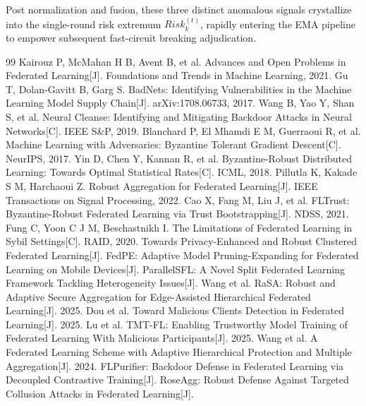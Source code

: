\documentclass[runningheads,orivec]{llncs}
\begin{document}
Post normalization and fusion, these three distinct anomalous signals crystallize into the single-round risk extremum $Risk_{k}^{(t)}$, rapidly entering the EMA pipeline to empower subsequent fast-circuit breaking adjudication.

\begin{thebibliography}{99}
     Kairouz P, McMahan H B, Avent B, et al. Advances and Open Problems in Federated Learning[J]. Foundations and Trends in Machine Learning, 2021.
     Gu T, Dolan-Gavitt B, Garg S. BadNets: Identifying Vulnerabilities in the Machine Learning Model Supply Chain[J]. arXiv:1708.06733, 2017.
     Wang B, Yao Y, Shan S, et al. Neural Cleanse: Identifying and Mitigating Backdoor Attacks in Neural Networks[C]. IEEE S\&P, 2019.
     Blanchard P, El Mhamdi E M, Guerraoui R, et al. Machine Learning with Adversaries: Byzantine Tolerant Gradient Descent[C]. NeurIPS, 2017.
     Yin D, Chen Y, Kannan R, et al. Byzantine-Robust Distributed Learning: Towards Optimal Statistical Rates[C]. ICML, 2018.
     Pillutla K, Kakade S M, Harchaoui Z. Robust Aggregation for Federated Learning[J]. IEEE Transactions on Signal Processing, 2022.
     Cao X, Fang M, Liu J, et al. FLTrust: Byzantine-Robust Federated Learning via Trust Bootstrapping[J]. NDSS, 2021.
     Fung C, Yoon C J M, Beschastnikh I. The Limitations of Federated Learning in Sybil Settings[C]. RAID, 2020.
     Towards Privacy-Enhanced and Robust Clustered Federated Learning[J].
     FedPE: Adaptive Model Pruning-Expanding for Federated Learning on Mobile Devices[J].
     ParallelSFL: A Novel Split Federated Learning Framework Tackling Heterogeneity Issues[J].
     Wang et al. RaSA: Robust and Adaptive Secure Aggregation for Edge-Assisted Hierarchical Federated Learning[J]. 2025.
     Dou et al. Toward Malicious Clients Detection in Federated Learning[J]. 2025.
     Lu et al. TMT-FL: Enabling Trustworthy Model Training of Federated Learning With Malicious Participants[J]. 2025.
     Wang et al. A Federated Learning Scheme with Adaptive Hierarchical Protection and Multiple Aggregation[J]. 2024.
     FLPurifier: Backdoor Defense in Federated Learning via Decoupled Contrastive Training[J].
     RoseAgg: Robust Defense Against Targeted Collusion Attacks in Federated Learning[J].

\end{thebibliography}
\end{document}
